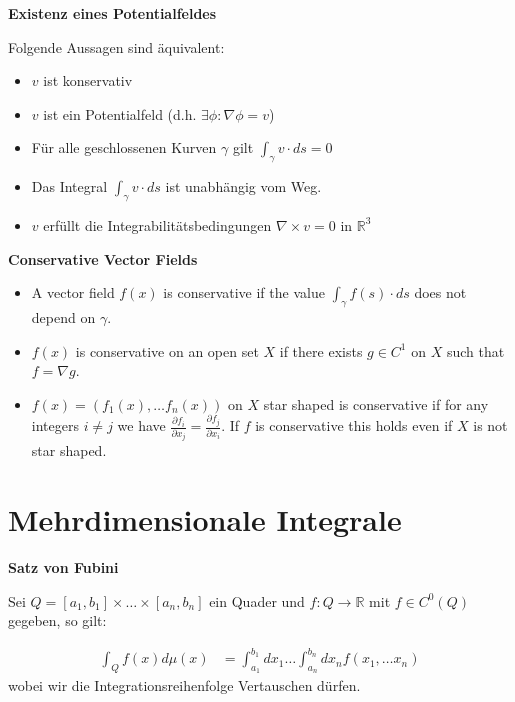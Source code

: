 \documentclass[25pt]{sciposter}
\newcommand{\R}{\mathbb{R}}
\newenvironment{method}[1]{\begin{mdframed}[backgroundcolor=blue!10,innertopmargin=15pt, innerbottommargin=15pt, nobreak=true]
		\textbf{#1 }
	}
	{ 
	\end{mdframed}
}
\begin{document}
\begin{multicols}{3}
\begin{method}{Existenz eines Potentialfeldes}
	Folgende Aussagen sind äquivalent:
	
	\begin{itemize}
		\item $v$ ist konservativ
		\item $v$ ist ein Potentialfeld  (d.h. $\exists \phi : \nabla \phi = v$)
		\item Für alle geschlossenen Kurven $\gamma$ gilt $\int_\gamma v\cdot ds = 0$
		\item Das Integral $\int_\gamma v\cdot ds$ ist unabhängig vom Weg.
		\item $v$ erfüllt die Integrabilitätsbedingungen $\nabla \times v = 0$ in $\R^3$
	\end{itemize}
	
\end{method}



\begin{method}{Conservative Vector Fields}
	 \begin{itemize}
	 	\item 	A vector field $f(x)$ is conservative if the value $\int_{\gamma} f(s)\cdot ds$ does not depend on $\gamma$. 
	 	\item $f(x)$ is conservative on an open set $X$ if there exists $g\in C^1$ on $X$ such that $f = \nabla g$.
	 	\item  $f(x) = (f_1(x),\ldots f_n(x))$ on $X$ star shaped is conservative if for any integers $i\neq j$ we have $\frac{\partial f_i}{\partial x_j} = \frac{\partial f_j}{\partial x_i}$. If $f$ is conservative this holds even if $X$ is not star shaped.
	 \end{itemize}	
\end{method}





\section{Mehrdimensionale Integrale}

\begin{method}{Satz von Fubini}
	Sei $Q=[a_1,b_1]\times \ldots \times [a_n,b_n]$ ein Quader und $f:Q\to \R$ mit $f\in C^0(Q)$ gegeben, so gilt:
	
	\begin{align*}
		\int_Q f(x) d\mu(x) &= \int_{a_1}^{b_1} dx_1 \ldots \int_{a_n}^{b_n} dx_n f(x_1,\ldots x_n)
	\end{align*}
	wobei wir die Integrationsreihenfolge Vertauschen dürfen.
\end{method}



\end{multicols}
\end{document}
